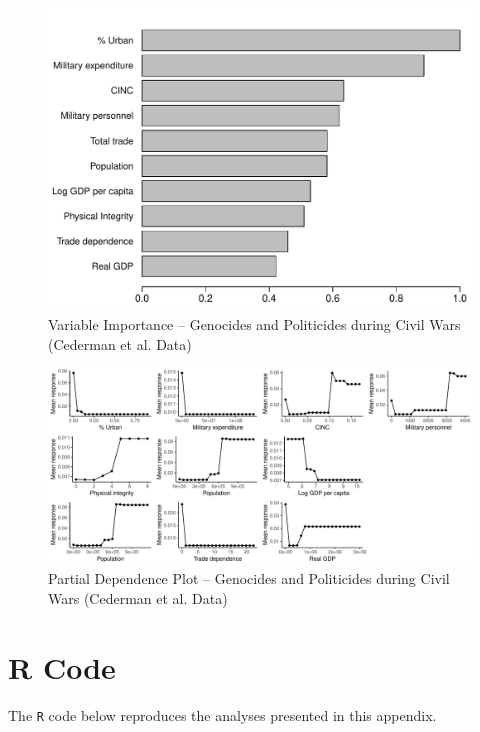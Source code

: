 \documentclass[a4paper,12pt]{article}
\begin{document}
\begin{figure}[H]
    \centering
    \includegraphics{images/rf-uamk-eth.pdf}
    \caption{Variable Importance -- Genocides and Politicides during Civil Wars (Cederman et al. Data)}
    \label{fig:rf-mk-ucdp}
\end{figure}

\newpage 

\begin{figure}[H]
    \centering
    \includegraphics[width=.98\textheight,angle=90]{images/rf-uamk-eth-pd.pdf}
    \caption{Partial Dependence Plot -- Genocides and Politicides during Civil Wars (Cederman et al. Data)}
    \label{fig:rf-mk-ucdp-pd}
\end{figure}

\section{R Code}
\label{sec:mk-code}

The \texttt{R} code below reproduces the analyses presented in this appendix.
\end{document}
